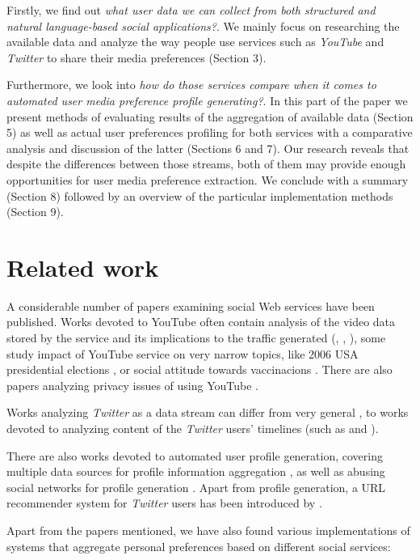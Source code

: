 \documentclass{article}
\begin{document}
Firstly, we find out \textit{what user data we can collect from both structured and natural language-based social applications?}. We mainly focus on researching the available data and analyze the way people use services such as
\textit{YouTube} and \textit{Twitter} to share their media preferences (Section 3).

Furthermore, we look into \textit{how do those services compare when it comes to automated user media
preference profile generating?}. In this part of the paper we present methods of evaluating results of
the aggregation of available data (Section 5) as well as actual user preferences profiling for both
services with a comparative analysis and discussion of the latter (Sections 6 and 7). Our research reveals that despite the
differences between those streams, both of them may provide enough opportunities for user media preference
extraction. We conclude with a summary (Section 8) followed by an overview of the particular implementation methods (Section 9).

\section{Related work}

A considerable number of papers examining social Web services have been
published. Works devoted to YouTube often contain analysis of the video data
stored by the service and its implications to the traffic generated
(\cite{i-tube-you-tube}, \cite{views-from-the-edge},
\cite{statistics-and-social-network}), some study impact of YouTube service on
very narrow topics, like 2006 USA presidential elections
\cite{voters-myspace-youtube}, or social attitude towards vaccinacions
\cite{keelan}. There are also papers analyzing privacy issues of using YouTube
\cite{publicly-private}.

Works analyzing \textit{Twitter} as a data stream can differ from very general \cite{why-we-twitter},
to works devoted to analyzing content of the \textit{Twitter} users' timelines (such as \cite{twitter-content-is-it} and \cite{short-tweet}).

There are also works devoted to automated user profile generation, covering multiple data sources for profile
information aggregation \cite{public-profiles}, as well as abusing social networks for profile generation \cite{twitter-abuse}. Apart from profile generation, a URL recommender system for \textit{Twitter} users
has been introduced by \cite{short-tweet}.

Apart from the papers mentioned, we have also found various implementations of systems that aggregate personal preferences based on different
social services:
\end{document}
